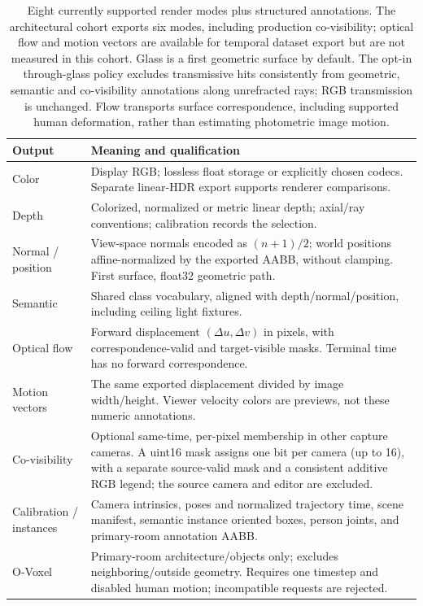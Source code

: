 \documentclass{article}
\begin{document}
\begin{table}[ht]
\centering\small
\begin{tabular}{p{.22\linewidth}p{.67\linewidth}}
\toprule
Output & Meaning and qualification\\\midrule
Color & Display RGB; lossless float storage or explicitly chosen codecs. Separate linear-HDR export supports renderer comparisons.\\
Depth & Colorized, normalized or metric linear depth; axial/ray conventions; calibration records the selection.\\
Normal / position & View-space normals encoded as $(n+1)/2$; world positions affine-normalized by the exported AABB, without clamping. First surface, float32 geometric path.\\
Semantic & Shared class vocabulary, aligned with depth/normal/position, including ceiling light fixtures.\\
Optical flow & Forward displacement $(\Delta u,\Delta v)$ in pixels, with correspondence-valid and target-visible masks. Terminal time has no forward correspondence.\\
Motion vectors & The same exported displacement divided by image width/height. Viewer velocity colors are previews, not these numeric annotations.\\
Co-visibility & Optional same-time, per-pixel membership in other capture cameras. A uint16 mask assigns one bit per camera (up to 16), with a separate source-valid mask and a consistent additive RGB legend; the source camera and editor are excluded.\\
Calibration / instances & Camera intrinsics, poses and normalized trajectory time, scene manifest, semantic instance oriented boxes, person joints, and primary-room annotation AABB.\\
O-Voxel & Primary-room architecture/objects only; excludes neighboring/outside geometry. Requires one timestep and disabled human motion; incompatible requests are rejected.\\\bottomrule
\end{tabular}
\caption{Eight currently supported render modes plus structured annotations. The architectural cohort exports six modes, including production co-visibility; optical flow and motion vectors are available for temporal dataset export but are not measured in this cohort. Glass is a first geometric surface by default. The opt-in through-glass policy excludes transmissive hits consistently from geometric, semantic and co-visibility annotations along unrefracted rays; RGB transmission is unchanged. Flow transports surface correspondence, including supported human deformation, rather than estimating photometric image motion.}
\end{table}
\end{document}
